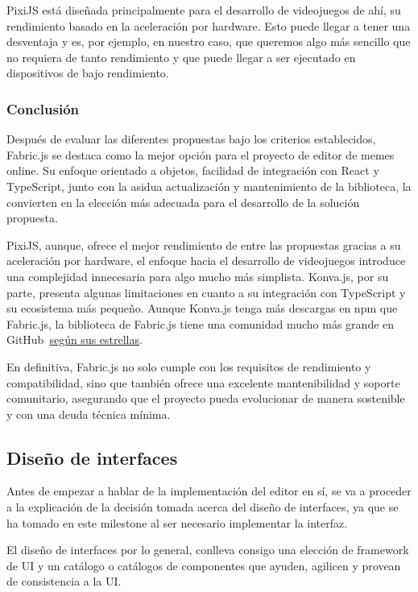 PixiJS está diseñada principalmente para el desarrollo de videojuegos de ahí, su rendimiento basado en la aceleración por hardware. Esto puede llegar a tener una desventaja y es, por ejemplo, en nuestro caso, que queremos algo más sencillo que no requiera de tanto rendimiento y que puede llegar a ser ejecutado en dispositivos de bajo rendimiento.

\subsubsection{Conclusión}

Después de evaluar las diferentes propuestas bajo los criterios establecidos, Fabric.js se destaca como la mejor opción para el proyecto de editor de memes online. Su enfoque orientado a objetos, facilidad de integración con React y TypeScript, junto con la asidua actualización y mantenimiento de la biblioteca, la convierten en la elección más adecuada para el desarrollo de la solución propuesta.

PixiJS, aunque, ofrece el mejor rendimiento de entre las propuestas gracias a su aceleración por hardware, el enfoque hacia el desarrollo de videojuegos introduce una complejidad innecesaria para algo mucho más simplista. Konva.js, por su parte, presenta algunas limitaciones en cuanto a su integración con TypeScript y su ecosistema más pequeño. Aunque Konva.js tenga más descargas en npm que Fabric.js, la biblioteca de Fabric.js tiene una comunidad mucho más grande en GitHub~\href{https://stackshare.io/stackups/bower-pixi-js-vs-fabricjs-vs-konva#description}{según sus estrellas}.

En definitiva, Fabric.js no solo cumple con los requisitos de rendimiento y compatibilidad, sino que también ofrece una excelente mantenibilidad y soporte comunitario, asegurando que el proyecto pueda evolucionar de manera sostenible y con una deuda técnica mínima.

\subsection{Diseño de interfaces}

Antes de empezar a hablar de la implementación del editor en sí, se va a proceder a la explicación de la decisión tomada acerca del diseño de interfaces, ya que se ha tomado en este milestone al ser necesario implementar la interfaz.

El diseño de interfaces por lo general, conlleva consigo una elección de framework de UI y un catálogo o catálogos de componentes que ayuden, agilicen y provean de consistencia a la UI.


